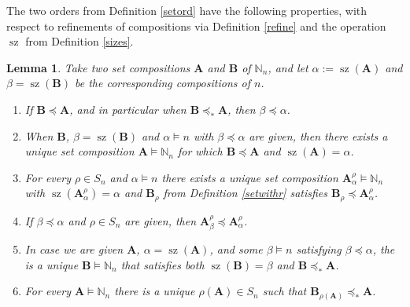 \documentclass{article}
\newtheorem{lem}[thm]{Lemma}
\theoremstyle{definition}
\begin{document}
The two orders from Definition \ref{setord} have the following properties, with respect to refinements of compositions via Definition \ref{refine} and the operation $\operatorname{sz}$ from Definition \ref{sizes}.
\begin{lem}
Take two set compositions $\mathbf{A}$ and $\mathbf{B}$ of $\mathbb{N}_{n}$, and let $\alpha:=\operatorname{sz}(\mathbf{A})$ and $\beta=\operatorname{sz}(\mathbf{B})$ be the corresponding compositions of $n$.
\begin{enumerate}[$(i)$]
\item If $\mathbf{B}\preceq\mathbf{A}$, and in particular when $\mathbf{B}\preceq_{*}\mathbf{A}$, then $\beta\preceq\alpha$.
\item When $\mathbf{B}$, $\beta=\operatorname{sz}(\mathbf{B})$ and $\alpha \vDash n$ with $\beta\preceq\alpha$ are given, then there exists a unique set composition $\mathbf{A}\vDash\mathbb{N}_{n}$ for which $\mathbf{B}\preceq\mathbf{A}$ and $\operatorname{sz}(\mathbf{A})=\alpha$.
\item For every $\rho \in S_{n}$ and $\alpha \vDash n$ there exists a unique set composition $\mathbf{A}_{\alpha}^{\rho}\vDash\mathbb{N}_{n}$ with $\operatorname{sz}(\mathbf{A}_{\alpha}^{\rho})=\alpha$ and $\mathbf{B}_{\rho}$ from
    Definition \ref{setwithr} satisfies $\mathbf{B}_{\rho}\preceq\mathbf{A}_{\alpha}^{\rho}$.
\item If $\beta\preceq\alpha$ and $\rho \in S_{n}$ are given, then $\mathbf{A}_{\beta}^{\rho}\preceq\mathbf{A}_{\alpha}^{\rho}$.
\item In case we are given $\mathbf{A}$, $\alpha=\operatorname{sz}(\mathbf{A})$, and some $\beta \vDash n$ satisfying $\beta\preceq\alpha$, the is a unique $\mathbf{B}\vDash\mathbb{N}_{n}$ that satisfies both $\operatorname{sz}(\mathbf{B})=\beta$ and $\mathbf{B}\preceq_{*}\mathbf{A}$.
\item For every $\mathbf{A}\vDash\mathbb{N}_{n}$ there is a unique $\rho(\mathbf{A}) \in S_{n}$ such that $\mathbf{B}_{\rho(\mathbf{A})}\preceq_{*}\mathbf{A}$.
\end{enumerate} \label{szord}
\end{lem}
\end{document}

